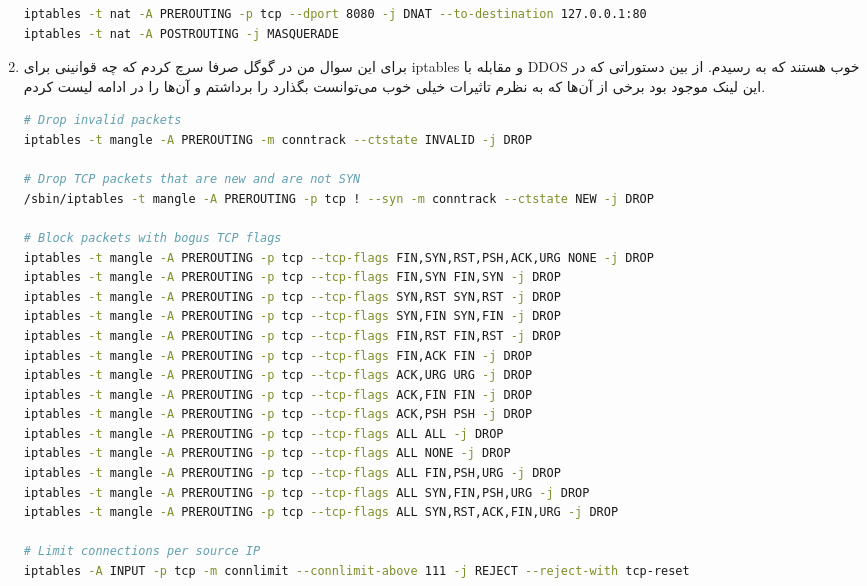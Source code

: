 \documentclass[]{article}
\begin{document}
\begin{enumerate}
\begin{latin}
\begin{lstlisting}[language=sh]
iptables -t nat -A PREROUTING -p tcp --dport 8080 -j DNAT --to-destination 127.0.0.1:80
iptables -t nat -A POSTROUTING -j MASQUERADE
\end{lstlisting}
\end{latin}
    \item برای این سوال من در گوگل صرفا سرچ کردم که چه قوانینی برای iptables و مقابله با DDOS خوب هستند که به
    رسیدم. از بین دستوراتی که در این لینک موجود بود برخی از آن‌ها که به نظرم تاثیرات خیلی خوب می‌توانست بگذارد را
    برداشتم و آن‌ها را در ادامه لیست کردم.
\begin{latin}
\begin{lstlisting}[language=sh]
# Drop invalid packets
iptables -t mangle -A PREROUTING -m conntrack --ctstate INVALID -j DROP
   
# Drop TCP packets that are new and are not SYN
/sbin/iptables -t mangle -A PREROUTING -p tcp ! --syn -m conntrack --ctstate NEW -j DROP

# Block packets with bogus TCP flags
iptables -t mangle -A PREROUTING -p tcp --tcp-flags FIN,SYN,RST,PSH,ACK,URG NONE -j DROP
iptables -t mangle -A PREROUTING -p tcp --tcp-flags FIN,SYN FIN,SYN -j DROP
iptables -t mangle -A PREROUTING -p tcp --tcp-flags SYN,RST SYN,RST -j DROP
iptables -t mangle -A PREROUTING -p tcp --tcp-flags SYN,FIN SYN,FIN -j DROP
iptables -t mangle -A PREROUTING -p tcp --tcp-flags FIN,RST FIN,RST -j DROP
iptables -t mangle -A PREROUTING -p tcp --tcp-flags FIN,ACK FIN -j DROP
iptables -t mangle -A PREROUTING -p tcp --tcp-flags ACK,URG URG -j DROP
iptables -t mangle -A PREROUTING -p tcp --tcp-flags ACK,FIN FIN -j DROP
iptables -t mangle -A PREROUTING -p tcp --tcp-flags ACK,PSH PSH -j DROP
iptables -t mangle -A PREROUTING -p tcp --tcp-flags ALL ALL -j DROP
iptables -t mangle -A PREROUTING -p tcp --tcp-flags ALL NONE -j DROP
iptables -t mangle -A PREROUTING -p tcp --tcp-flags ALL FIN,PSH,URG -j DROP
iptables -t mangle -A PREROUTING -p tcp --tcp-flags ALL SYN,FIN,PSH,URG -j DROP
iptables -t mangle -A PREROUTING -p tcp --tcp-flags ALL SYN,RST,ACK,FIN,URG -j DROP

# Limit connections per source IP
iptables -A INPUT -p tcp -m connlimit --connlimit-above 111 -j REJECT --reject-with tcp-reset


\end{lstlisting}
\end{latin}
\end{enumerate}
\end{document}
